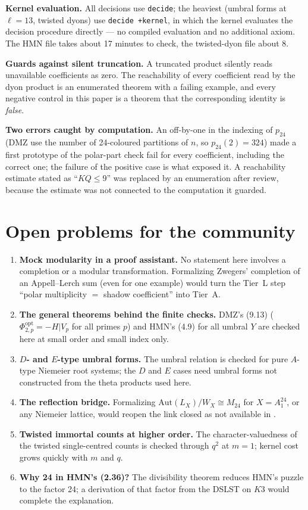 \documentclass[11pt,a4paper]{article}
\theoremstyle{remark}
\newcommand{\Mtf}{M_{24}}
\begin{document}
\textbf{Kernel evaluation.} All decisions use \texttt{decide}; the heaviest (umbral forms at
$\ell=13$, twisted dyons) use \texttt{decide +kernel}, in which the kernel evaluates the decision procedure
directly --- no compiled evaluation and no additional axiom. The HMN file takes about 17 minutes to check,
the twisted-dyon file about 8.

\textbf{Guards against silent truncation.} A truncated product silently reads unavailable coefficients as
zero. The reachability of every coefficient read by the dyon product is an enumerated theorem with a
failing example, and every negative control in this paper is a theorem that the corresponding identity is
\emph{false}.

\textbf{Two errors caught by computation.} An off-by-one in the indexing of $p_{24}$ (DMZ use the number of
24-coloured partitions of $n$, so $p_{24}(2)=324$) made a first prototype of the polar-part check fail for
every coefficient, including the correct one; the failure of the positive case is what exposed it. A
reachability estimate stated as ``$KQ\le9$'' was replaced by an enumeration after review, because the
estimate was not connected to the computation it guarded.

\section{Open problems for the community}
\label{sec:open}
\begin{enumerate}
\item \textbf{Mock modularity in a proof assistant.} No statement here involves a completion or a modular
transformation. Formalizing Zwegers' completion of an Appell--Lerch sum (even for one example) would turn
the Tier~L step ``polar multiplicity $=$ shadow coefficient'' into Tier~A.
\item \textbf{The general theorems behind the finite checks.} DMZ's (9.13) ($\Phi^{\mathrm{opt}}_{2,p}=-H|V_p$
for all primes $p$) and HMN's (4.9) for all umbral $Y$ are checked here at small order and small index only.
\item \textbf{$D$- and $E$-type umbral forms.} The umbral relation is checked for pure $A$-type Niemeier root
systems; the $D$ and $E$ cases need umbral forms not constructed from the theta products used here.
\item \textbf{The reflection bridge.} Formalizing $\mathrm{Aut}(L_X)/W_X\cong\Mtf$ for $X=A_1^{24}$, or any
Niemeier lattice, would reopen the link closed as not available in .
\item \textbf{Twisted immortal counts at higher order.} The character-valuedness of the twisted
single-centred counts is checked through $q^2$ at $m=1$; kernel cost grows quickly with $m$ and $q$.
\item \textbf{Why 24 in HMN's (2.36)?} The divisibility theorem reduces HMN's puzzle to the factor 24; a
derivation of that factor from the DSLST on $K3$ would complete the explanation.
\end{enumerate}
\end{document}
